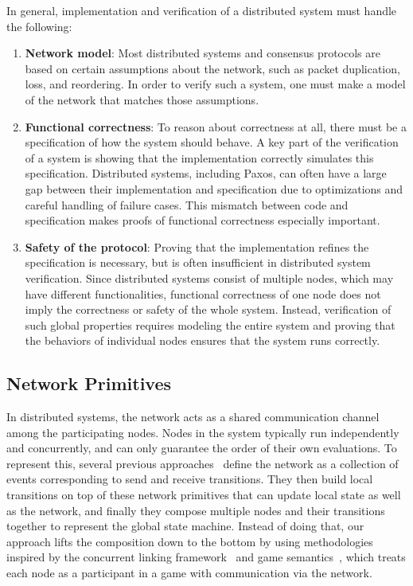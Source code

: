 In general, implementation and verification of a distributed system must handle the following:
\begin{enumerate}
\item \textbf{Network model}:
Most distributed systems and consensus protocols are based on certain assumptions about the network,
such as packet duplication, loss, and reordering. In order to verify such a system, one must make a model of the network that matches
those assumptions.

\item \textbf{Functional correctness}: 
To reason about correctness at all, there must be a specification of how the system should behave.
A key part of the verification of a system is showing that the implementation correctly simulates this specification.
Distributed systems, including Paxos, can often have a large gap between their implementation and specification due to optimizations and careful handling of failure cases.
This mismatch between code and specification makes proofs of functional correctness especially important.

\item \textbf{Safety of the protocol}: 
Proving that the implementation refines the specification is necessary, but is often insufficient in distributed system verification.
Since distributed systems consist of multiple nodes, which may have different functionalities,
functional correctness of one node does not imply the correctness or safety of the whole system.
Instead, verification of such global properties requires modeling the entire system and
proving that the behaviors of individual nodes ensures that the system runs correctly.
\end{enumerate}




\subsection{Network Primitives}
\label{subsec:network-primitives}

In distributed systems, the network acts as a shared communication channel among the participating nodes.
Nodes in the system typically run independently and concurrently, and can only guarantee the order of their own evaluations.
To represent this, several previous approaches~\cite{verdi, disel}
define the network as a collection of events corresponding to send and receive transitions.
They then build local transitions on top of these network primitives that can update local state as well as the network,
and finally they compose multiple nodes and their transitions together to represent the global state machine.
Instead of doing that, our approach lifts the composition down to the bottom by using methodologies
inspired by the concurrent linking framework~\cite{concurrency} and game semantics~\cite{gsinvite},
which treats each node as a participant in a game with communication via the network.

